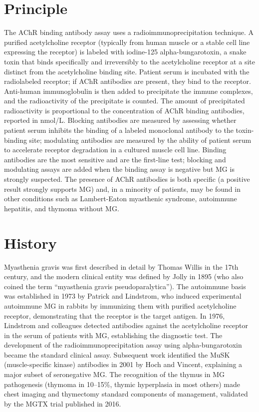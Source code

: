 \section*{Principle}
The AChR binding antibody assay uses a radioimmunoprecipitation technique. A purified acetylcholine receptor (typically from human muscle or a stable cell line expressing the receptor) is labeled with iodine-125 alpha-bungarotoxin, a snake toxin that binds specifically and irreversibly to the acetylcholine receptor at a site distinct from the acetylcholine binding site. Patient serum is incubated with the radiolabeled receptor; if AChR antibodies are present, they bind to the receptor. Anti-human immunoglobulin is then added to precipitate the immune complexes, and the radioactivity of the precipitate is counted. The amount of precipitated radioactivity is proportional to the concentration of AChR binding antibodies, reported in nmol/L. Blocking antibodies are measured by assessing whether patient serum inhibits the binding of a labeled monoclonal antibody to the toxin-binding site; modulating antibodies are measured by the ability of patient serum to accelerate receptor degradation in a cultured muscle cell line. Binding antibodies are the most sensitive and are the first-line test; blocking and modulating assays are added when the binding assay is negative but MG is strongly suspected. The presence of AChR antibodies is both specific (a positive result strongly supports MG) and, in a minority of patients, may be found in other conditions such as Lambert-Eaton myasthenic syndrome, autoimmune hepatitis, and thymoma without MG.

\section*{History}
Myasthenia gravis was first described in detail by Thomas Willis in the 17th century, and the modern clinical entity was defined by Jolly in 1895 (who also coined the term ``myasthenia gravis pseudoparalytica''). The autoimmune basis was established in 1973 by Patrick and Lindstrom, who induced experimental autoimmune MG in rabbits by immunizing them with purified acetylcholine receptor, demonstrating that the receptor is the target antigen. In 1976, Lindstrom and colleagues detected antibodies against the acetylcholine receptor in the serum of patients with MG, establishing the diagnostic test. The development of the radioimmunoprecipitation assay using alpha-bungarotoxin became the standard clinical assay. Subsequent work identified the MuSK (muscle-specific kinase) antibodies in 2001 by Hoch and Vincent, explaining a major subset of seronegative MG. The recognition of the thymus in MG pathogenesis (thymoma in 10--15\%, thymic hyperplasia in most others) made chest imaging and thymectomy standard components of management, validated by the MGTX trial published in 2016.

